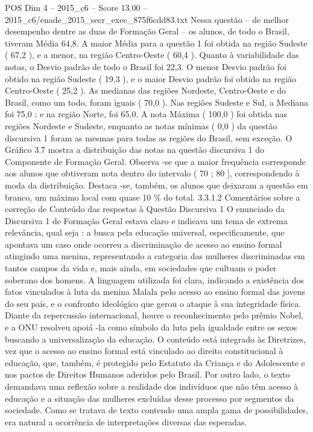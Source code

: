 \begin{textsample}{POS Dim 4 – 2015\_c6 – Score 13.00 – 2015\_c6/enade\_2015\_secr\_exec\_875f6cdd83.txt}
Nessa questão – de melhor desempenho dentre as duas de Formação Geral – os alunos, de todo o Brasil, tiveram Média 64,8.
A maior Média para a questão 1 foi obtida na região Sudeste ( 67,2 ), e a menor, na região Centro-Oeste ( 60,4 ).
Quanto à variabilidade das notas, o Desvio padrão de todo o Brasil foi 22,3.
O menor Desvio padrão foi obtido na região Sudeste ( 19,3 ), e o maior Desvio padrão foi obtido na região Centro-Oeste ( 25,2 ).
As medianas das regiões Nordeste, Centro-Oeste e do Brasil, como um todo, foram iguais ( 70,0 ).
Nas regiões Sudeste e Sul, a Mediana foi 75,0 ; e na região Norte, foi 65,0.
A nota Máxima ( 100,0 ) foi obtida nas regiões Nordeste e Sudeste, enquanto as notas mínimas ( 0,0 ) da questão discursiva 1 foram as mesmas para todas as regiões do Brasil, sem exceção.
O Gráfico 3.7 mostra a distribuição das notas na questão discursiva 1 do Componente de Formação Geral.
Observa -se que a maior frequência corresponde aos alunos que obtiveram nota dentro do intervalo ( 70 ; 80 ], correspondendo à moda da distribuição.
Destaca -se, também, os alunos que deixaram a questão em branco, um máximo local com quase 10 \% do total. 3.3.1.2 Comentários sobre a correção de Conteúdo das respostas à Questão Discursiva 1 O enunciado da Discursiva 1 de Formação Geral estava claro e indicava um tema de extrema relevância, qual seja : a busca pela educação universal, especificamente, que apontava um caso onde ocorreu a discriminação de acesso ao ensino formal atingindo uma menina, representando a categoria das mulheres discriminadas em tantos campos da vida e, mais ainda, em sociedades que cultuam o poder soberano dos homens.
A linguagem utilizada foi clara, indicando a existência dos fatos vinculados à luta da menina Malala pelo acesso ao ensino formal das jovens do seu país, e o confronto ideológico que gerou o ataque à sua integridade física.
Diante da repercussão internacional, houve o reconhecimento pelo prêmio Nobel, e a ONU resolveu apoiá -la como símbolo da luta pela igualdade entre os sexos buscando a universalização da educação.
O conteúdo está integrado às Diretrizes, vez que o acesso ao ensino formal está vinculado ao direito constitucional à educação, que, também, é protegido pelo Estatuto da Criança e do Adolescente e nos pactos de Direitos Humanos aderidos pelo Brasil.
Por outro lado, o texto demandava uma reflexão sobre a realidade dos indivíduos que não têm acesso à educação e a situação das mulheres excluídas desse processo por segmentos da sociedade.
Como se tratava de texto contendo uma ampla gama de possibilidades, era natural a ocorrência de interpretações diversas das esperadas.

\end{textsample}
